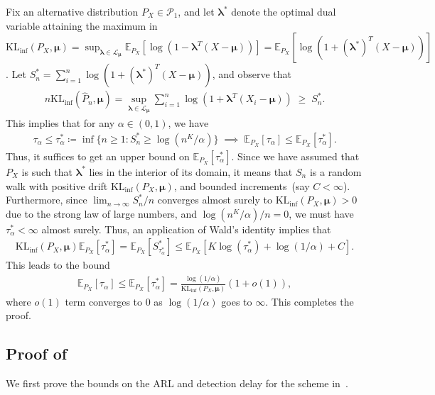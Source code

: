 \documentclass{article}
\theoremstyle{plain}
\theoremstyle{definition}
\newcommand{\KLinf}{\operatorname{KL_{inf}}}
\newcommand{\calP}{\mathcal P}
\newcommand{\calL}{\mathcal L}
\newcommand{\boldlambda}{\boldsymbol{\lambda}}
\newcommand{\boldmu}{\boldsymbol{\mu}}
\newcommand{\dualdomain}{\calL_{\boldmu}}
\begin{document}
 Fix an alternative distribution $P_X \in \calP_1$, and let $\boldlambda^*$ denote the optimal dual variable attaining the maximum in $\KLinf(P_X, \boldmu) = \sup_{\boldlambda\in \dualdomain} \mathbb{E}_{P_X}[\log(1 - \boldlambda^T(X-\boldmu))] = \mathbb{E}_{P_X}[\log(1+(\boldlambda^*)^T(X-\boldmu))]$. Let $S^*_n = \sum_{i=1}^n \log(1+ (\boldlambda^*)^T(X-\boldmu))$, and observe that 
\begin{align}
    n \KLinf(\widehat{P}_n, \boldmu) = \sup_{\boldlambda \in \dualdomain} \sum_{i=1}^n \log (1 + \boldlambda^T(X_i-\boldmu)) \; \geq \; S_n^*. 
\end{align}
This implies that for any $\alpha \in(0,1)$, we have 
\begin{align}
    \tau_\alpha \leq \tau^*_\alpha \coloneqq \inf \{n \geq 1: S_n^* \geq \log(n^K/\alpha)\} \; \implies \; \mathbb{E}_{P_X}[\tau_\alpha] \leq  \mathbb{E}_{P_X}[\tau_\alpha^*]. 
\end{align}
Thus, it suffices to get an upper bound on $\mathbb{E}_{P_X}[\tau^*_\alpha]$. Since we have assumed that $P_X$ is such that $\boldlambda^*$ lies in the interior of its domain, it means that $S_n$ is a random walk with positive drift $\KLinf(P_X, \boldmu)$, and bounded increments~(say $C<\infty$). Furthermore, since $\lim_{n \to \infty} S_n^*/n$ converges almost surely to $\KLinf(P_X, \boldmu) > 0$ due to the strong law of large numbers, and $\log(n^K/\alpha)/n = 0$, we must have $\tau_\alpha^* < \infty$ almost surely. Thus, an application of Wald's identity implies that 
\begin{align}
    \KLinf(P_X, \boldmu) \mathbb{E}_{P_X}[\tau_\alpha^*] = \mathbb{E}_{P_X}[S_{\tau^*_\alpha}^*]  \leq \mathbb{E}_{P_X}\left[ K \log(\tau_\alpha^*) + \log(1/\alpha) + C \right]. 
\end{align}
This leads to the bound 
\begin{align}
    \mathbb{E}_{P_X}[\tau_\alpha] \leq \mathbb{E}_{P_X}[\tau_\alpha^*] = \frac{\log(1/\alpha)}{\KLinf(P_X, \boldmu)}\left(1 + o(1) \right), 
\end{align}
where $o(1)$ term converges to $0$ as $\log(1/\alpha)$ goes to $\infty$.  This completes the proof. 



\subsection{Proof of~}
\label{proof:change-detection}
We first prove the bounds on the ARL and detection delay for the scheme in~.
\end{document}
